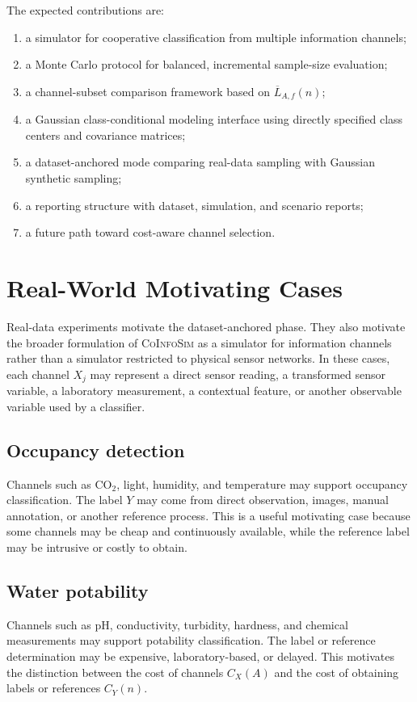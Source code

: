 \documentclass[11pt,a4paper]{article}
\newcommand{\CoInfoSim}{\textsc{CoInfoSim}}
\begin{document}
The expected contributions are:
\begin{enumerate}
    \item a simulator for cooperative classification from multiple information channels;
    \item a Monte Carlo protocol for balanced, incremental sample-size evaluation;
    \item a channel-subset comparison framework based on $\overline{L}_{A,f}(n)$;
    \item a Gaussian class-conditional modeling interface using directly specified class centers and covariance matrices;
    \item a dataset-anchored mode comparing real-data sampling with Gaussian synthetic sampling;
    \item a reporting structure with dataset, simulation, and scenario reports;
    \item a future path toward cost-aware channel selection.
\end{enumerate}


\appendix

\section{Real-World Motivating Cases}

Real-data experiments motivate the dataset-anchored phase. They also motivate the broader formulation of \CoInfoSim{} as a simulator for information channels rather than a simulator restricted to physical sensor networks. In these cases, each channel $X_j$ may represent a direct sensor reading, a transformed sensor variable, a laboratory measurement, a contextual feature, or another observable variable used by a classifier.

\subsection*{Occupancy detection}
Channels such as CO$_2$, light, humidity, and temperature may support occupancy classification. The label $Y$ may come from direct observation, images, manual annotation, or another reference process. This is a useful motivating case because some channels may be cheap and continuously available, while the reference label may be intrusive or costly to obtain.

\subsection*{Water potability}
Channels such as pH, conductivity, turbidity, hardness, and chemical measurements may support potability classification. The label or reference determination may be expensive, laboratory-based, or delayed. This motivates the distinction between the cost of channels $C_X(A)$ and the cost of obtaining labels or references $C_Y(n)$.
\end{document}
